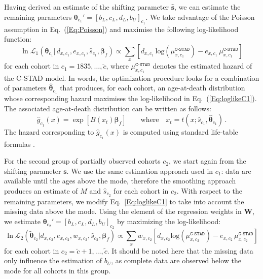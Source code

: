 \documentclass[11pt, a4paper]{article}
\begin{document}
Having derived an estimate of the shifting parameter $\hat{\bm{s}}$, we can estimate the remaining parameters $\bm{\theta}_{c_{1}}'=\left[b_{L},c_{L},d_{L},b_{U}\right]_{c_{1}}$. We take advantage of the Poisson assumption in Eq.~(\ref{Eq:Poisson}) and maximise the following log-likelihood function:
%
\begin{equation}\label{Eq:loglikeC1}
\ln\mathcal{L}_1\left(\bm{\theta}_{c_{1}} | \, d_{x,c_{1}} , e_{x,c_{1}} , \hat{s}_{c_{1}}, \bm{\beta}_{f}
\right) \propto \sum_{x} \left[  d_{x,c_{1}} \,
\mathrm{log} \left( \mu^{\texttt{C-STAD}}_{x,c_{1}}  \right) - e_{x,c_{1}}
\, \mu^{\texttt{C-STAD}}_{x,c_{1}} \right] 
\end{equation}
%
for each cohort in $c_{1} = 1835,\ldots,\breve{c}$, where $\mu^{\texttt{C-STAD}}_{x,c_{1}}$ denotes the estimated hazard of the C-STAD model. In words, the optimization procedure looks for a combination of parameters $\hat{\bm{\theta}}_{c_{1}}$ that produces, for each cohort, an age-at-death distribution
whose corresponding hazard maximises the log-likelihood in Eq.~(\ref{Eq:loglikeC1}). The associated age-at-death distribution can be written as follows:
\begin{equation}\label{eq:gBspl}
\hat{g}_{c_{1}}(x) = \exp\left[ B(x_{t}) \bm{\beta}_{f} \right] \qquad \mbox{where} \quad x_{t} = t(x; \hat{s}_{c_{1}},\hat{\bm{\theta}}_{c_{1}}) \, .
\end{equation}
The hazard corresponding to $\hat{g}_{c_{1}}(x)$ is computed using standard life-table formulas \citep{preston2001demogr}.

For the second group of partially observed cohorts $c_2$, we start again from the shifting parameter $\bm{s}$. We use the same estimation approach used in $c_1$: data are available until the ages above the mode, therefore the smoothing approach produces an estimate of $M$ and $\hat{s}_{c_{2}}$ for each cohort in $c_2$. With respect to the remaining parameters, we modify Eq.~\eqref{Eq:loglikeC1} to take into account the missing data above the mode. Using the element of the regression weights in $\bm{W}$, we estimate $\bm{\theta}_{c_{2}}'=\left[b_{L},c_{L},d_{L},b_{U}\right]_{c_{2}}$ by maximizing the log-likelihood:
%
\begin{equation}\label{Eq:loglikeC2}
\ln\mathcal{L}_2\left(\tilde{\bm{\theta}}_{c_{2}} | d_{x,c_{2}} , e_{x,c_{2}} , w_{x,c_{2}} , \hat{s}_{c_{2}}, \bm{\beta}_{f}
\right) \propto \sum_{x} w_{x,c_{2}} \left[  d_{x,c_{2}} \mathrm{log} \left( \mu^{\texttt{C-STAD}}_{x,c_{2}}  \right) - e_{x,c_{2}}
\, \mu^{\texttt{C-STAD}}_{x,c_{2}} \right] 
\end{equation}
%
for each cohort in $c_{2}=\breve{c}+1,\ldots,\tilde{c}$. It should be noted here that the missing data only influence the estimation of $b_U$, as complete data are observed below the mode for all cohorts in this group. 
\end{document}
